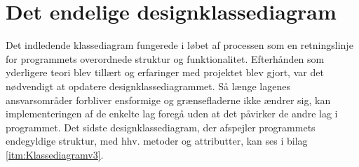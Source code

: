 \section{Det endelige designklassediagram}
Det indledende klassediagram fungerede i løbet af processen som en retningslinje for programmets overordnede struktur og funktionalitet. Efterhånden som yderligere teori blev tillært og erfaringer med projektet blev gjort, var det nødvendigt at opdatere designklassediagrammet. Så længe lagenes ansvarsområder forbliver ensformige og grænsefladerne ikke ændrer sig, kan implementeringen af de enkelte lag foregå uden at det påvirker de andre lag i programmet. 
Det sidste designklassediagram, der afspejler programmets endegyldige struktur, med hhv. metoder og attributter, kan ses i bilag \ref{itm:Klassediagramv3}.







